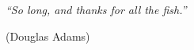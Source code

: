 \pagestyle{empty}
\chapter*{}
\vspace{17.5cm}
\vfill
\hfill
\parbox{.6\textwidth}{
{\it``So long, and thanks for all the fish.''}}
\begin{flushright}
(Douglas Adams)
\end{flushright}

